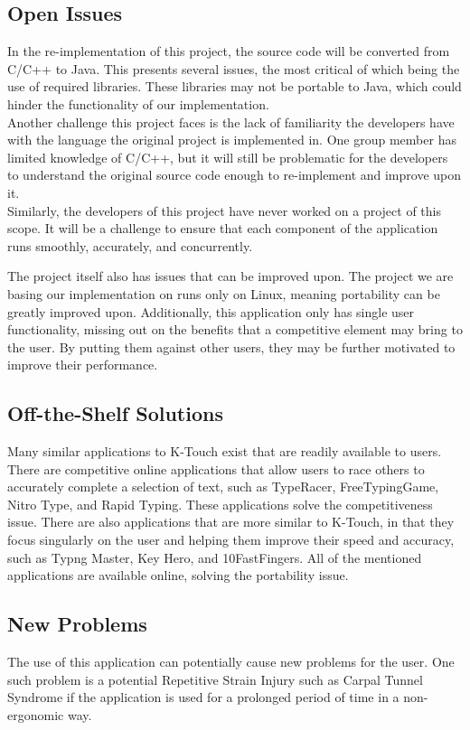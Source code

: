 \documentclass[12pt, titlepage]{article}
\begin{document}
\subsection{Open Issues}
\indent \indent In the re-implementation of this project, the source code will be converted from C/C++ to Java. This presents several issues, the most critical of which being the use of required libraries. These libraries may not be portable to Java, which could hinder the functionality of our implementation. 
\\
\indent Another challenge this project faces is the lack of familiarity the developers have with the language the original project is implemented in. One group member has limited knowledge of C/C++, but it will still be problematic for the developers to understand the original source code enough to re-implement and improve upon it.
\\
\indent Similarly, the developers of this project have never worked on a project of this scope. It will be a challenge to ensure that each component of the application runs smoothly, accurately, and concurrently.

\indent The project itself also has issues that can be improved upon. The project we are basing our implementation on runs only on Linux, meaning portability can be greatly improved upon. Additionally, this application only has single user functionality, missing out on the benefits that a competitive element may bring to the user. By putting them against other users, they may be further motivated to improve their performance.

\subsection{Off-the-Shelf Solutions}
\indent \indent Many similar applications to K-Touch exist that are readily available to users. There are competitive online applications that allow users to race others to accurately complete a selection of text, such as TypeRacer, FreeTypingGame, Nitro Type, and Rapid Typing. These applications solve the competitiveness issue. There are also applications that are more similar to K-Touch, in that they focus singularly on the user and helping them improve their speed and accuracy, such as Typng Master, Key Hero, and 10FastFingers. All of the mentioned applications are available online, solving the portability issue.

\subsection{New Problems}
\indent \indent The use of this application can potentially cause new problems for the user. One such problem is a potential Repetitive Strain Injury such as Carpal Tunnel Syndrome if the application is used for a prolonged period of time in a non-ergonomic way. 
\end{document}
